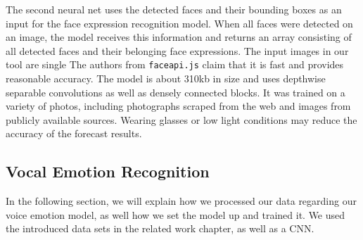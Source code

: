 The second neural net uses the detected faces and their bounding boxes as an input for the face expression recognition model. When all faces were detected on an image, the model receives this information and returns an array consisting of all detected faces and their belonging face expressions. The input images in our tool are single The authors from \texttt{faceapi.js} claim that it is fast and provides reasonable accuracy. The model is about 310kb in size and uses depthwise separable convolutions as well as densely connected blocks. It was trained on a variety of photos, including photographs scraped from the web and images from publicly available sources. Wearing glasses or low light conditions may reduce the accuracy of the forecast results.


\subsection{Vocal Emotion Recognition}
\label{subsec:method_vocal_emotion_recognition}
In the following section, we will explain how we processed our data regarding our voice emotion model, as well how we set the model up and trained it. We used the introduced data sets in the related work chapter, as well as a CNN. 

